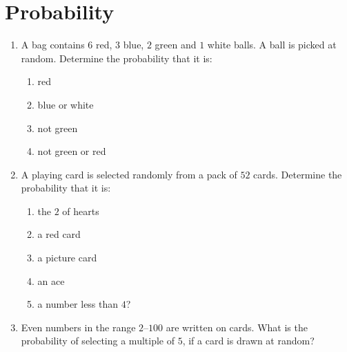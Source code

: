 \chapter{Probability}

\begin{exercises}{}
{
  \begin{enumerate}[itemsep=5pt, label=\textbf{\arabic*}. ]
  \item 
A bag contains $6$ red, $3$ blue, $2$ green and $1$ white
    balls. A ball is picked at random. Determine the probability that it
    is:
    \begin{enumerate}[noitemsep, label=\textbf{(\alph*)} ]
    \item red
    \item blue or white
    \item not green
    \item not green or red
    \end{enumerate}
  \item 
A playing card is selected randomly from a pack of $52$
    cards. Determine the probability that it is:
    \begin{enumerate}[noitemsep, label=\textbf{(\alph*)} ]
    \item the $2$ of hearts
    \item a red card
    \item a picture card
    \item an ace
    \item a number less than $4$?
    \end{enumerate}
\item Even numbers in the range $2$--$100$ are written on cards. 
  What is
    the probability of selecting a multiple of $5$, if a card is drawn
    at random?
\end{enumerate}
}
\end{exercises}


